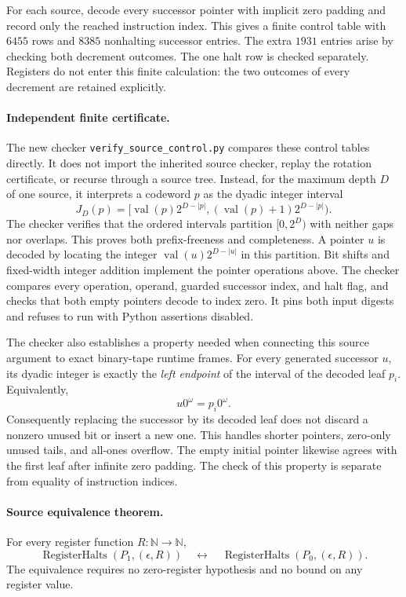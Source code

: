For each source, decode every successor pointer with implicit
zero padding and record only the reached instruction index.
This gives a finite control table with $6455$ rows and $8385$
nonhalting successor entries.  The extra $1931$ entries arise by
checking both decrement outcomes.  The one halt row is checked
separately.  Registers do not enter this finite calculation:
the two outcomes of every decrement are retained explicitly.

\paragraph{Independent finite certificate.}
The new checker \texttt{verify\_source\_control.py} compares these
control tables directly.  It does not import the inherited source
checker, replay the rotation certificate, or recurse through a
source tree.  Instead, for the maximum depth $D$ of one source,
it interprets a codeword $p$ as the dyadic integer interval
\[
  J_D(p)=
  [\operatorname{val}(p)2^{D-|p|},
   (\operatorname{val}(p)+1)2^{D-|p|}).
\]
The checker verifies that the ordered intervals partition
$[0,2^D)$ with neither gaps nor overlaps.  This proves both
prefix-freeness and completeness.  A pointer $u$ is decoded by
locating the integer $\operatorname{val}(u)2^{D-|u|}$ in this
partition.  Bit shifts and fixed-width integer addition implement
the pointer operations above.  The checker compares every
operation, operand, guarded successor index, and halt flag,
and checks that both empty pointers decode to index zero.
It pins both input digests and refuses to run with Python
assertions disabled.

The checker also establishes a property needed when connecting
this source argument to exact binary-tape runtime frames.  For
every generated successor $u$, its dyadic integer is exactly the
\emph{left endpoint} of the interval of the decoded leaf $p_i$.
Equivalently,
\[
             u0^\omega=p_i0^\omega.
\]
Consequently replacing the successor by its decoded leaf does
not discard a nonzero unused bit or insert a new one.  This
handles shorter pointers, zero-only unused tails, and all-ones
overflow.  The empty initial pointer likewise agrees with the
first leaf after infinite zero padding.  The check of this
property is separate from equality of instruction indices.

\paragraph{Source equivalence theorem.}
For every register function $R:\mathbb N\to\mathbb N$,
\[
 \operatorname{RegisterHalts}(P_1,(\epsilon,R))
 \quad\longleftrightarrow\quad
 \operatorname{RegisterHalts}(P_0,(\epsilon,R)).
\]
The equivalence requires no zero-register hypothesis and no
bound on any register value.

